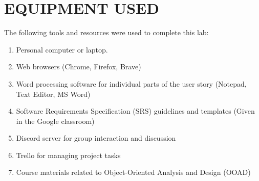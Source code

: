 \chapter{EQUIPMENT USED}
\label{ch:eqp_used}
The following tools and resources were used to complete this lab:
\begin{enumerate}
    \item Personal computer or laptop.
    \item Web browsers (Chrome, Firefox, Brave)
    \item Word processing software for individual parts of the user story (Notepad, Text Editor, MS Word)
    \item Software Requirements Specification (SRS) guidelines and templates (Given in the Google classroom)
    \item Discord server for group interaction and discussion
    \item Trello for managing project tasks
    \item Course materials related to Object-Oriented Analysis and Design (OOAD)

\end{enumerate}
\clearpage




